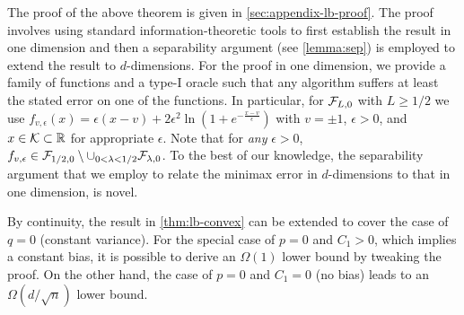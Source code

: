 The proof of the above theorem is given in \cref{sec:appendix-lb-proof}. The proof involves using standard information-theoretic tools to first establish the result in one dimension and then a separability argument (see \cref{lemma:sep}) is employed to extend the result to $d$-dimensions. 
For the proof in one dimension, we provide a family of functions and a type-I oracle such that any algorithm suffers at least the stated error on one of the functions. In particular, for $\mathcal{F}_{L,0}$ with $L\ge 1/2$ we use
$f_{v,\epsilon}(x)=\epsilon\left( x-v\right)+2\epsilon^2 \ln\left(1+e^{-\frac{x-v}{\epsilon}}  \right)$ with $v=\pm 1$, $\epsilon>0$, and $x \in \mathcal{K} \subset \mathbb{R}$ for appropriate $\epsilon$. Note that for \emph{any} $\epsilon>0$, $f_{v,\epsilon}\in \mathcal{F}_{1/2,0}\setminus \cup_{0<\lambda<1/2} \mathcal{F}_{\lambda,0}$.
To the best of our knowledge, the separability argument that we employ to relate the minimax error in $d$-dimensions to that in one dimension, is novel. 

\begin{remark}
By continuity, the result in \cref{thm:lb-convex} can be extended to cover the case of $q=0$ (constant variance). 
For the special case of $p=0$ and $C_1>0$, which implies a constant bias, it is possible to derive an $\Omega(1)$ lower bound by tweaking the proof. On the other hand, the case of $p=0$ and $C_1=0$ (no bias) leads to an $\Omega(d/\sqrt{n})$ lower bound. 
\end{remark}

